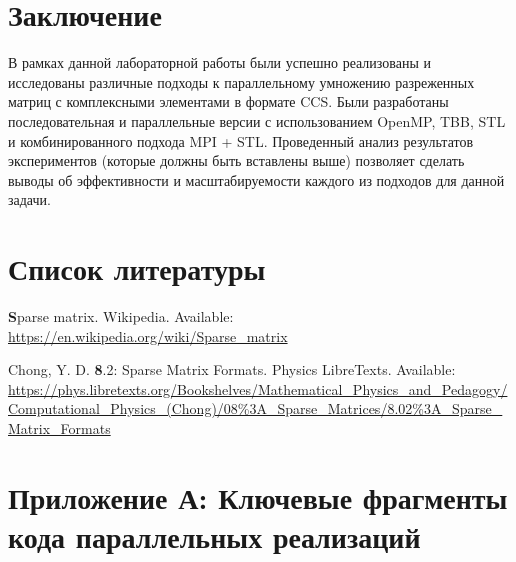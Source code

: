 \documentclass[12pt]{article}
\begin{document}
\section{Заключение}
В рамках данной лабораторной работы были успешно реализованы и исследованы различные подходы к параллельному умножению разреженных матриц с комплексными элементами в формате CCS. Были разработаны последовательная и параллельные версии с использованием OpenMP, TBB, STL и комбинированного подхода MPI + STL. Проведенный анализ результатов экспериментов (которые должны быть вставлены выше) позволяет сделать выводы об эффективности и масштабируемости каждого из подходов для данной задачи.
\newpage
{
\section{Список литературы}
\renewcommand{\section}[2]{}
\begin{thebibliography}{2}

{\textbf Sparse matrix.} Wikipedia. Available: \url{https://en.wikipedia.org/wiki/Sparse_matrix}

Chong, Y. D. {\textbf 8.2: Sparse Matrix Formats.} Physics LibreTexts. Available: \url{https://phys.libretexts.org/Bookshelves/Mathematical_Physics_and_Pedagogy/Computational_Physics_(Chong)/08%3A_Sparse_Matrices/8.02%3A_Sparse_Matrix_Formats}

\end{thebibliography}
\newpage
}

\section{Приложение А: Ключевые фрагменты кода параллельных реализаций}
\end{document}
